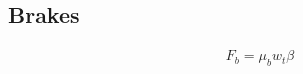 \documentclass[../SimBALink.tex]{subfiles}
\begin{document}
\subsection{Brakes}

\begin{gather}
F_b = \mu_b w_t \beta
\end{gather}
\end{document}
